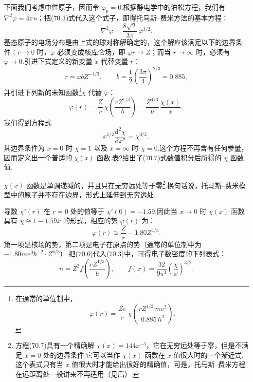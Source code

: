 下面我们考虑中性原子，因而令 $\varphi_0=0$.根据静电学中的泊松方程，我们有 $\nabla^{2}\varphi=4\pi n$；把(70.3)式代入这个式子，即得托马斯–费米方法的基本方程：
\begin{equation}
  \nabla^{2}\varphi=\frac{8\sqrt{2}}{3\pi}\,\varphi^{3/2}.
\end{equation}
基态原子的电场分布是由上式的球对称解确定的，这个解应该满足以下的边界条件：$r\rightarrow0$ 时，$\varphi$ 必须变成核库仑场，即 $\varphi r\rightarrow Z$；而当 $r\rightarrow\infty$ 时，必须有 $\varphi\rightarrow0$.引进下式定义的新变量 $x$ 代替变量 $r$：
\begin{equation}
  r=xbZ^{-1/3},\qquad
  b=\frac{1}{2}\left(\frac{3\pi}{4}\right)^{2/3}=0.885,
\end{equation}
并引进下列新的未知函数\footnote{在通常的单位制中，
\begin{equation*}
  \varphi(r)=\frac{Ze}{r}\,\chi\!\left(\frac{rZ^{1/3}\,me^{2}}{0.885\,\hbar^{2}}\right).
\end{equation*}}$\chi$ 代替 $\varphi$：
\begin{equation}
  \varphi(r)=\frac{Z}{r}\,\chi\left(\frac{rZ^{1/3}}{b}\right)
  =\frac{Z^{4/3}}{b}\,\frac{\chi(x)}{x},
\end{equation}
我们得到方程式
\begin{equation}
  x^{1/2}\frac{\mathrm{d}^{2}\chi}{\mathrm{d}x^{2}}=\chi^{3/2},
\end{equation}
其边界条件为 $x=0$ 时 $\chi=1$ 以及 $x=\infty$ 时 $\chi=0$.这个方程不再含有任何参量，因而定义出一个普适的 $\chi(x)$ 函数.表2给出了(70.7)式数值积分后所得的 $\chi$ 函数值.

$\chi(x)$ 函数是单调递减的，并且只在无穷远处等于零\footnote{方程(70.7)具有一个精确解 $\chi(x)=144x^{-3}$，它在无穷远处等于零，但是不满足 $x=0$ 处的边界条件.它可以当作 $\chi(x)$ 函数在 $x$ 值很大时的一个渐近式.这个表式只有当 $x$ 值很大时才能给出很好的精确值，可是，托马斯–费米方程在远距离处一般讲来不再适用（见后）.}.换句话说，托马斯–费米模型中的原子并不存在边界，形式上延伸到无穷远处.

导数 $\chi'(r)$ 在 $r=0$ 处的值等于 $\chi'(0)=-1.59$.因此当 $x\rightarrow0$ 时 $\chi(x)$ 函数具有 $\chi\cong1-1.59x$ 的形式，相应的势 $\varphi(r)$ 为：
\begin{equation}
  \varphi(r)\cong\frac{Z}{r}-1.80Z^{4/3}.
\end{equation}
第一项是核场的势，第二项是电子在原点的势（通常的单位制中为 $-1.80me^{3}\hbar^{-2}\cdot Z^{4/3}$）.把(70.6)代入(70.3)中，可得电子数密度的下列表式：
\begin{equation}
  n=Z^{2}f\left(\frac{rZ^{1/3}}{b}\right),
  \qquad
  f(x)=\frac{32}{9\pi^{3}}\left(\frac{\chi}{x}\right)^{3/2}.
\end{equation}

